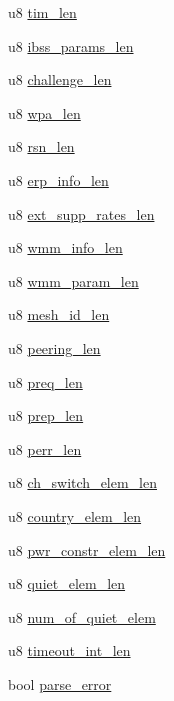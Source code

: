 \begin{DoxyCompactItemize}
\item 
u8 \hyperlink{structieee802__11__elems_ab90447c07ba9f8b23a4508f5c2ab7850}{tim\-\_\-len}
\item 
u8 \hyperlink{structieee802__11__elems_ae1caf3e856db41c098dae539cce1b7b9}{ibss\-\_\-params\-\_\-len}
\item 
u8 \hyperlink{structieee802__11__elems_a17a8ec03c6d59e1bde0bfc2ffc72972c}{challenge\-\_\-len}
\item 
u8 \hyperlink{structieee802__11__elems_a46f04df3a13e3b941f3250516466e8ba}{wpa\-\_\-len}
\item 
u8 \hyperlink{structieee802__11__elems_af457de8cfed4f313c6a1e8154ce440f6}{rsn\-\_\-len}
\item 
u8 \hyperlink{structieee802__11__elems_a8075695419d6f4cca5146e607aa26900}{erp\-\_\-info\-\_\-len}
\item 
u8 \hyperlink{structieee802__11__elems_ad801aa33ff70dfe5cd7ff32f039799ab}{ext\-\_\-supp\-\_\-rates\-\_\-len}
\item 
u8 \hyperlink{structieee802__11__elems_abb89de16d0721b263ad0098cbb8edd51}{wmm\-\_\-info\-\_\-len}
\item 
u8 \hyperlink{structieee802__11__elems_a8bd489ba83474d318aabdb2ca4ffb0e2}{wmm\-\_\-param\-\_\-len}
\item 
u8 \hyperlink{structieee802__11__elems_a8d28b6eb74e2a40cdbf971786344b947}{mesh\-\_\-id\-\_\-len}
\item 
u8 \hyperlink{structieee802__11__elems_a4ee92ca9513f9ef27a1609135452129b}{peering\-\_\-len}
\item 
u8 \hyperlink{structieee802__11__elems_a5eac1db084f68b936ee32adf0e8e6b0d}{preq\-\_\-len}
\item 
u8 \hyperlink{structieee802__11__elems_a1a08ce2841b5af833d18884e6e2e1b88}{prep\-\_\-len}
\item 
u8 \hyperlink{structieee802__11__elems_a29835ac7646e7afef597ea41654ff3a9}{perr\-\_\-len}
\item 
u8 \hyperlink{structieee802__11__elems_afcbd333fdb9a00d0293ce5a2aa67a51f}{ch\-\_\-switch\-\_\-elem\-\_\-len}
\item 
u8 \hyperlink{structieee802__11__elems_ae24d95c5691f6017fcbfd8f7a5933990}{country\-\_\-elem\-\_\-len}
\item 
u8 \hyperlink{structieee802__11__elems_a74dc471871aaafc9bed087c079c4c8c3}{pwr\-\_\-constr\-\_\-elem\-\_\-len}
\item 
u8 \hyperlink{structieee802__11__elems_af5b177a26c37c42cfe6b7a5b4d900cfe}{quiet\-\_\-elem\-\_\-len}
\item 
u8 \hyperlink{structieee802__11__elems_aa9bb9f08b902ed1012cb04ac64824f49}{num\-\_\-of\-\_\-quiet\-\_\-elem}
\item 
u8 \hyperlink{structieee802__11__elems_a95b4deaebcafd728c67639bd307e91e8}{timeout\-\_\-int\-\_\-len}
\item 
bool \hyperlink{structieee802__11__elems_a63b1a4ce3aea3d6ed94b79b863d0594d}{parse\-\_\-error}
\end{DoxyCompactItemize}


